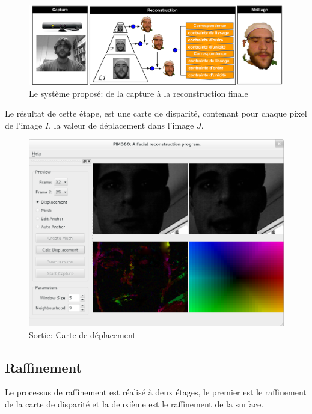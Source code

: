 \documentclass[a4paper,12pt]{article}
\begin{document}
\begin{figure}[ht!]
  \begin{center}
    \includegraphics[scale=0.35]{img/projSystem.png}
    \caption{Le système proposé: de la capture à la reconstruction finale}
  \end{center}
\end{figure}

Le résultat de cette étape, est une carte de disparité, contenant pour
chaque pixel de l'image $I$, la valeur de déplacement dans l'image
$J$. 

\begin{figure}[ht!]
  \begin{center}
    \includegraphics[scale=0.4]{img/dispMap.png}
    \caption{Sortie: Carte de déplacement}
  \end{center}
\end{figure}


\newpage
\subsection{Raffinement}

Le processus de raffinement est réalisé à deux étages, le premier est le
raffinement de la carte de disparité et la deuxième est le raffinement
de la surface.  
\end{document}
